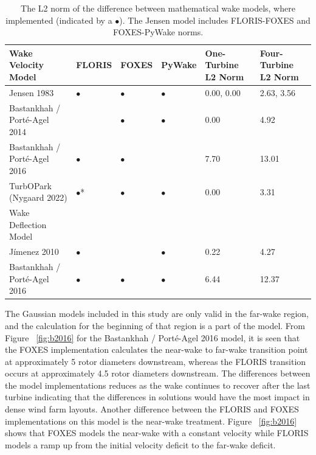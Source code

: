 \documentclass{iopconfser}
\newcommand{\ind}[]{\hspace{6mm}}
\begin{document}
\begin{table}[!h]
\caption{The L2 norm of the difference between mathematical wake models, where implemented (indicated by a $\bullet$). The Jensen model includes FLORIS-FOXES and FOXES-PyWake norms.}
\label{tab:error}
\centering
\begin{tabular}{llllll}
\toprule
{Wake Velocity Model} & {FLORIS} & {FOXES} & {PyWake} & {One-Turbine L2 Norm}& {Four-Turbine L2 Norm}\\ \midrule
Jensen 1983                            & $\bullet$ & $\bullet$ & $\bullet$ & 0.00, 0.00 & 2.63, 3.56 \\
Bastankhah / Porté-Agel 2014           &           & $\bullet$ & $\bullet$ & 0.00 & 4.92 \\
Bastankhah / Porté-Agel 2016           & $\bullet$ & $\bullet$ &           & 7.70 & 13.01\\
TurbOPark (Nygaard 2022)               & $\bullet$*& $\bullet$ & $\bullet$ & 0.00 & 3.31 \\
\midrule
{Wake Deflection Model}                &           &           &           &      &      \\
\midrule
Jímenez 2010                           & $\bullet$ &           & $\bullet$ & 0.22 & 4.27\\
Bastankhah / Porté-Agel 2016           & $\bullet$ & $\bullet$ & $\bullet$ & 6.44 & 12.37\\
\bottomrule
\end{tabular}
\end{table}

\ind{}The Gaussian models included in this study are only valid in the far-wake region, and the calculation for the beginning of that region is a part of the model.
From Figure ~\ref{fig:b2016} for the Bastankhah / Porté-Agel 2016 model, it is seen that the FOXES implementation calculates the near-wake to far-wake transition point at approximately 5 rotor diameters downstream, whereas the FLORIS transition occurs at approximately 4.5 rotor diameters downstream.
The differences between the model implementations reduces as the wake continues to recover after the last turbine indicating that the differences in solutions would have the most impact in dense wind farm layouts.
Another difference between the FLORIS and FOXES implementations on this model is the near-wake treatment.
Figure ~\ref{fig:b2016} shows that FOXES models the near-wake with a constant velocity while FLORIS models a ramp up from the initial velocity deficit to the far-wake deficit.
\end{document}
